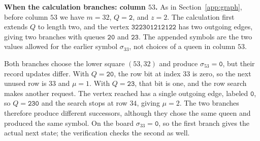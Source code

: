 \medskip\noindent
\textbf{When the calculation branches: column $53$.}
As in Section~\ref{app:graph}, before column $53$ we have $m=32$,
$Q=\mathtt{2}$, and $z=2$. The calculation first extends $Q$ to
length two, and the vertex $\mathtt{322301212122}$ has two outgoing
edges, giving two branches with queues $\mathtt{20}$ and
$\mathtt{23}$. The appended symbols are the two values allowed for
the earlier symbol $\sigma_{33}$, not choices of a queen in
column $53$.

Both branches choose the lower square $(53,32)$ and produce
$\sigma_{53}=\mathtt{0}$, but their record updates differ. With
$Q=\mathtt{20}$, the row bit at index $33$ is zero, so the next
unused row is $33$ and $\mu=1$. With $Q=\mathtt{23}$, that bit is
one, and the row search makes another request. The vertex reached
has a single outgoing edge, labeled $\mathtt{0}$, so $Q=\mathtt{230}$ and the
search stops at row $34$, giving $\mu=2$. The two branches therefore
produce different successors, although they chose the same queen and
produced the same symbol. On the board $\sigma_{33}=\mathtt{0}$, so the first
branch gives the actual next state; the verification checks the
second as well.
